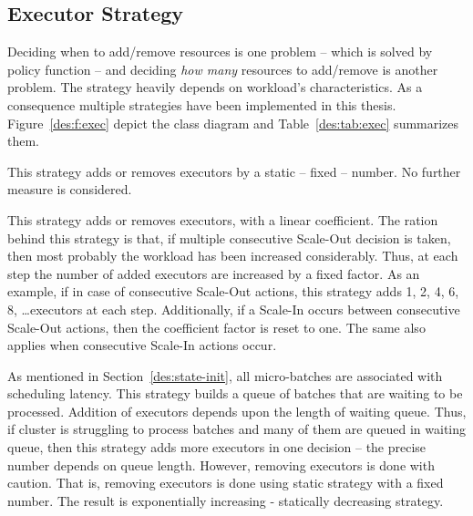\subsection{Executor Strategy}
Deciding when to add/remove resources is one problem -- which is solved by policy function -- and deciding \emph{how many} resources to add/remove is another problem. The strategy heavily depends on workload's characteristics. As a consequence multiple strategies have been implemented in this thesis. Figure~\ref{des:f:exec} depict the class diagram and Table~\ref{des:tab:exec} summarizes them.
\begin{description}[leftmargin=0pt]
    \item[Static Strategy] This strategy adds or removes executors by a static -- fixed -- number. No further measure is considered.
    \item[Linear Strategy] This strategy adds or removes executors, with a linear coefficient. The ration behind this strategy is that, if multiple consecutive Scale-Out decision is taken, then most probably the workload has been increased considerably. Thus, at each step the number of added executors are increased by a fixed factor. As an example, if in case of consecutive Scale-Out actions, this strategy adds 1, 2, 4, 6, 8, \dots executors at each step. Additionally, if a Scale-In occurs between consecutive Scale-Out actions, then the coefficient factor is reset to one. The same also applies when consecutive Scale-In actions occur. 
    \item[Queue Aware Strategy] As mentioned in Section~\ref{des:state-init}, all micro-batches are associated with scheduling latency. This strategy builds a queue of batches that are waiting to be processed. Addition of executors depends upon the length of waiting queue. Thus, if cluster is struggling to process batches and many of them are queued in waiting queue, then this strategy adds more executors in one decision -- the precise number depends on queue length. However, removing executors is done with caution. That is, removing executors is done using static strategy with a fixed number. The result is exponentially increasing - statically decreasing strategy.
\end{description}

